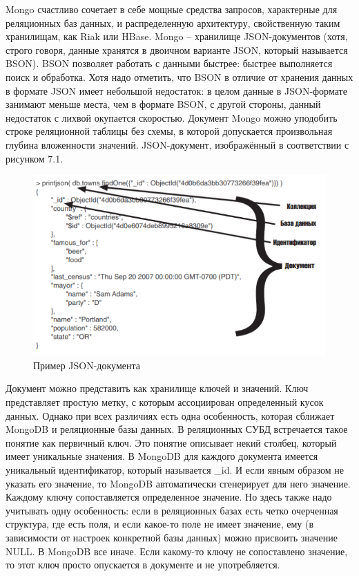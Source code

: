 \documentclass[14pt]{extreport}
\begin{document}
Mongo счастливо сочетает в себе мощные средства запросов, характерные для реляционных баз данных, и распределенную архитектуру, свойственную таким хранилищам, как Riak или HBase. Mongo – хранилище JSON-документов (хотя, строго говоря, данные хранятся в двоичном варианте JSON, который называется BSON). BSON позволяет работать с данными быстрее: быстрее выполняется поиск и обработка. Хотя надо отметить, что BSON в отличие от хранения данных в формате JSON имеет небольшой недостаток: в целом данные в JSON-формате занимают меньше места, чем в формате BSON, с другой стороны, данный недостаток с лихвой окупается скоростью. Документ Mongo можно уподобить строке реляционной таблицы без схемы, в которой допускается произвольная глубина вложенности значений. JSON-документ, изображённый в соответствии с рисунком 7.1.
\begin{figure}[H]
\center\includegraphics[scale=0.75]{fig/img81.png}
\caption{Пример JSON-документа}
\end{figure}

Документ можно представить как хранилище ключей и значений. Ключ представляет простую метку, с которым ассоциирован определенный кусок данных. Однако при всех различиях есть одна особенность, которая сближает MongoDB и реляционные базы данных. В реляционных СУБД встречается такое понятие как первичный ключ. Это понятие описывает некий столбец, который имеет уникальные значения. В MongoDB для каждого документа имеется уникальный идентификатор, который называется \_id. И если явным образом не указать его значение, то MongoDB автоматически сгенерирует для него значение. Каждому ключу сопоставляется определенное значение. Но здесь также надо учитывать одну особенность: если в реляционных базах есть четко очерченная структура, где есть поля, и если какое-то поле не имеет значение, ему (в зависимости от настроек конкретной базы данных) можно присвоить значение NULL. В MongoDB все иначе. Если какому-то ключу не сопоставлено значение, то этот ключ просто опускается в документе и не употребляется.
\end{document}
